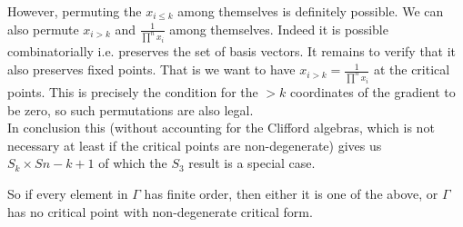 \documentclass[a4paper]{article}
\begin{document}
However, permuting the $x_{i\le k}$ among themselves is definitely possible. We can also permute $x_{i>k}$ and $\frac{1}{\prod^{n}x_{i}}$ among themselves. Indeed it is possible combinatorially i.e. preserves the set of basis vectors. It remains to verify that it also preserves fixed points. 
That is we want to have $x_{i>k}=\frac{1}{\prod^{n}x_{i}}$ at the critical points. This is precisely the condition for the $>k$ coordinates of the gradient to be zero, so such permutations are also legal.\\
In conclusion this (without accounting for the Clifford algebras, which is not necessary at least if the critical points are non-degenerate) gives us $S_{k}\times S{n-k+1}$ of which the $S_3$ result is a special case.


So if every element in $\Gamma$ has finite order, then either it is one of the above, or $\Gamma$ has no critical point with non-degenerate critical form.
\end{document}
